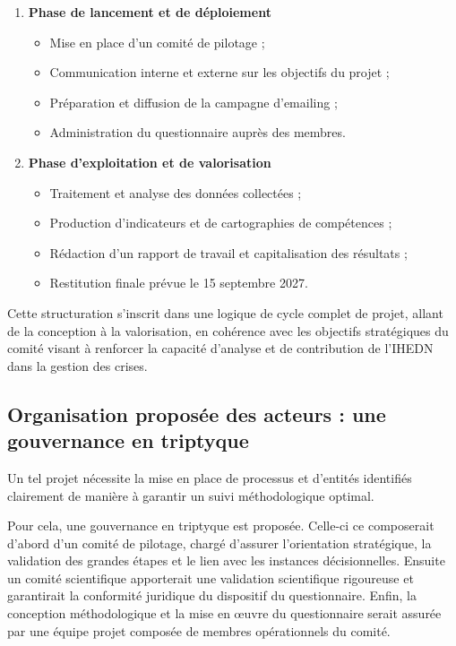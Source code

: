 \documentclass[12pt,a4paper]{article}
\begin{document}
\begin{enumerate}[resume]

    \item \textbf{Phase de lancement et de déploiement}
    \begin{itemize}
        \item Mise en place d'un comité de pilotage ;
        \item Communication interne et externe sur les objectifs du projet ;
        \item Préparation et diffusion de la campagne d'emailing ;
        \item Administration du questionnaire auprès des membres.
    \end{itemize}

    \item \textbf{Phase d'exploitation et de valorisation}
    \begin{itemize}
        \item Traitement et analyse des données collectées ;
        \item Production d'indicateurs et de cartographies de compétences ;
        \item Rédaction d'un rapport de travail et capitalisation des résultats ;
        \item Restitution finale prévue le 15 septembre 2027.
    \end{itemize}
\end{enumerate}

Cette structuration s'inscrit dans une logique de cycle complet de projet, allant de la conception à la valorisation, en cohérence avec les objectifs stratégiques du comité visant à renforcer la capacité d'analyse et de contribution de l'IHEDN dans la gestion des crises.

\clearpage

\subsection{Organisation proposée des acteurs : une gouvernance en triptyque}

Un tel projet nécessite la mise en place de processus et d'entités identifiés clairement de manière à garantir un suivi méthodologique optimal.

Pour cela, une gouvernance en triptyque est proposée. Celle-ci ce composerait d'abord d'un comité de pilotage, chargé d'assurer l'orientation stratégique, la validation des grandes étapes et le lien avec les instances décisionnelles. Ensuite un comité scientifique apporterait une validation scientifique rigoureuse et garantirait la conformité juridique du dispositif du questionnaire. Enfin, la conception méthodologique et la mise en \oe{}uvre du questionnaire serait assurée par une équipe projet composée de membres opérationnels du comité.
\end{document}
